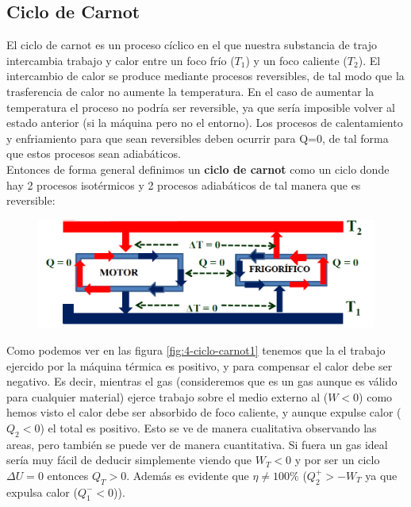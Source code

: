 \documentclass[12pt,a4paper]{article}
\begin{document}
\subsection{Ciclo de Carnot}

El ciclo de carnot es un proceso cíclico en el que nuestra substancia de trajo intercambia trabajo y calor entre un foco frío ($T_1$) y un foco caliente ($T_2$). El intercambio de calor se produce mediante procesos reversibles, de tal modo que la  trasferencia de calor no aumente la temperatura. En el caso de aumentar la temperatura el proceso no podría ser reversible, ya que sería imposible volver al estado anterior (si la máquina pero no el entorno). Los procesos de calentamiento y enfriamiento para que sean reversibles deben ocurrir para Q=0, de tal forma que estos procesos sean adiabáticos. \\

Entonces de forma general definimos un \textbf{ciclo de carnot} como un ciclo donde hay 2 procesos isotérmicos y 2 procesos adiabáticos de tal manera que es reversible:

\begin{figure}[h!]
\centering
\includegraphics[scale=0.4]{Ciclo-de-carnot.png}
\end{figure}

Como podemos ver en las figura \ref{fig:4-ciclo-carnot1} tenemos que la el trabajo ejercido por la máquina térmica es positivo, y para compensar el calor debe ser negativo. Es decir, mientras el gas (consideremos que es un gas aunque es válido para cualquier material) ejerce trabajo sobre el medio externo al ($W<0$) como hemos visto el calor debe ser absorbido de foco caliente, y aunque expulse calor ($Q_2<0$) el total es positivo. Esto se ve de manera cualitativa observando las areas, pero también se puede ver de manera cuantitativa. Si fuera un gas ideal sería muy fácil de deducir simplemente viendo que $W_T<0$ y por ser un ciclo $\Delta U = 0$ entonces $Q_T>0$. Además es evidente que  $\eta \neq 100\% $ ($Q_2^+ > -W_T$ ya que expulsa calor ($Q_1^-<0$)). \\
\end{document}
